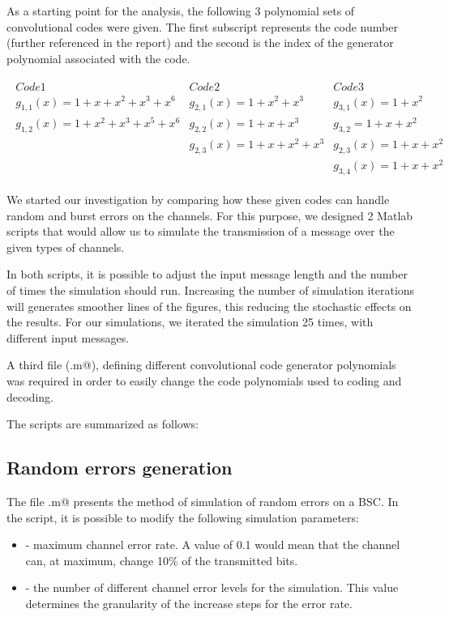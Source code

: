 As a starting point for the analysis, the following 3 polynomial sets of convolutional codes were given. The first subscript represents the code number (further referenced in the report) and the second is the index of the generator polynomial associated with the code.

\begin{align*}
\begin{matrix}
Code 1&Code 2&Code 3\\
g_{1,1}(x) = 1 + x + x^2 + x^3 + x^6&g_{2,1}(x) = 1 + x^2 + x^3&g_{3,1}(x)=1 + x^2\\
g_{1,2}(x) = 1 + x^2 + x^3 + x^5 + x^6&g_{2,2}(x)=1 + x + x^3&g_{3,2} = 1+x+x^2\\
&g_{2,3}(x) = 1+x+x^2+x^3&g_{2,3}(x)=1+x+x^2\\
&&g_{3,4}(x) = 1+x+x^2
\end{matrix}
\end{align*}

We started our investigation by comparing how these given codes can handle random and burst errors on the channels. For this purpose, we designed 2 Matlab scripts that would allow us to simulate the transmission of a message over the given types of channels.

In both scripts, it is possible to adjust the input message length and the number of times the simulation should run. Increasing the number of simulation iterations will generates smoother lines of the figures, this reducing the stochastic effects on the results. For our simulations, we iterated the simulation 25 times, with different input messages.

A third file (\verb@trellisGenerator.m@), defining different convolutional code generator polynomials was required in order to easily change the code polynomials used to coding and decoding.

The scripts are summarized as follows:

\subsection{Random errors generation}

The file \verb@randomErrors.m@ presents the method of simulation of random errors on a BSC. In the script, it is possible to modify the following simulation parameters:

\begin{itemize}
   \item \verb@maxCER@ - maximum channel error rate. A value of 0.1 would mean that the channel can, at maximum, change 10\% of the transmitted bits.
   \item \verb@CERLevels@ - the number of different channel error levels for the simulation. This value determines the granularity of the increase steps for the error rate.  
\end{itemize}

